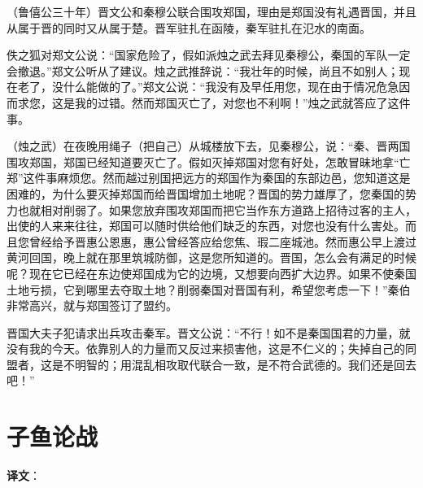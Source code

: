 \documentclass[12pt,UTF-8,openany]{ctexbook}
\begin{document}
\begin{normalsize}
    
    （鲁僖公三十年）晋文公和秦穆公联合围攻郑国，理由是郑国没有礼遇晋国，并且从属于晋的同时又从属于楚。晋军驻扎在函陵，秦军驻扎在氾水的南面。
    
    佚之狐对郑文公说：“国家危险了，假如派烛之武去拜见秦穆公，秦国的军队一定会撤退。”郑文公听从了建议。烛之武推辞说：“我壮年的时候，尚且不如别人；现在老了，没什么能做的了。”郑文公说：“我没有及早任用您，现在由于情况危急因而求您，这是我的过错。然而郑国灭亡了，对您也不利啊！”烛之武就答应了这件事。
    
    （烛之武）在夜晚用绳子（把自己）从城楼放下去，见秦穆公，说：“秦、晋两国围攻郑国，郑国已经知道要灭亡了。假如灭掉郑国对您有好处，怎敢冒昧地拿“亡郑”这件事麻烦您。然而越过别国把远方的郑国作为秦国的东部边邑，您知道这是困难的，为什么要灭掉郑国而给晋国增加土地呢？晋国的势力雄厚了，您秦国的势力也就相对削弱了。如果您放弃围攻郑国而把它当作东方道路上招待过客的主人，出使的人来来往往，郑国可以随时供给他们缺乏的东西，对您也没有什么害处。而且您曾经给予晋惠公恩惠，惠公曾经答应给您焦、瑕二座城池。然而惠公早上渡过黄河回国，晚上就在那里筑城防御，这是您所知道的。晋国，怎么会有满足的时候呢？现在它已经在东边使郑国成为它的边境，又想要向西扩大边界。如果不使秦国土地亏损，它到哪里去夺取土地？削弱秦国对晋国有利，希望您考虑一下！”秦伯非常高兴，就与郑国签订了盟约。
    
    晋国大夫子犯请求出兵攻击秦军。晋文公说：“不行！如不是秦国国君的力量，就没有我的今天。依靠别人的力量而又反过来损害他，这是不仁义的；失掉自己的同盟者，这是不明智的；用混乱相攻取代联合一致，是不符合武德的。我们还是回去吧！”
    
\end{normalsize}



\chapter{子鱼论战}

\begin{normalsize}
    
    
\end{normalsize}


\newpage

\textbf{译文}：

\vspace{1em}

\begin{normalsize}
    
    
    
\end{normalsize}
\end{document}
